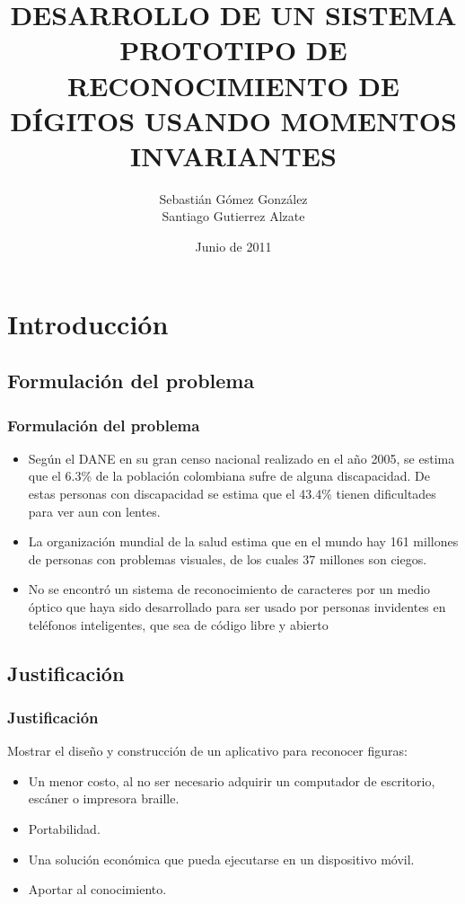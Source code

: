 \documentclass{beamer}
\title {DESARROLLO DE UN SISTEMA PROTOTIPO DE RECONOCIMIENTO DE DÍGITOS USANDO MOMENTOS INVARIANTES}
\author { Sebastián Gómez González \\ Santiago Gutierrez Alzate}
\date {Junio de 2011}
\begin{document}
	\frame{\titlepage}
	
	\frame{\tableofcontents}
	
	\section{Introducción}
	\subsection{Formulación del problema}
	\begin{frame}
		\frametitle{Formulación del problema}
		\begin{itemize}
			\item Según el DANE en su gran censo nacional realizado en el año 2005, se estima que el 6.3\% de la población colombiana sufre de alguna discapacidad. De estas personas con discapacidad se estima que el 43.4\% tienen dificultades para ver aun con lentes.\pause
			\item La organización mundial de la salud estima que en el mundo hay 161 millones de personas con problemas visuales, de los cuales 37 millones son ciegos.\pause
			\item No se encontró un sistema de reconocimiento de caracteres por un medio óptico que haya sido desarrollado para ser usado por personas invidentes en teléfonos inteligentes, que sea de código libre y abierto 
		\end{itemize}
	\end{frame}
	
	\subsection{Justificación}
	\begin{frame}
		\frametitle{Justificación}
		Mostrar el diseño y construcción de un aplicativo para reconocer figuras: \pause
		\begin{itemize}
			\item Un menor costo, al no ser necesario adquirir un computador de escritorio, escáner o impresora braille. \pause
			\item Portabilidad.\pause
			\item Una solución económica que pueda ejecutarse en un dispositivo móvil.\pause
			\item Aportar al conocimiento.
		\end{itemize}
	\end{frame}
	
\end{document}
